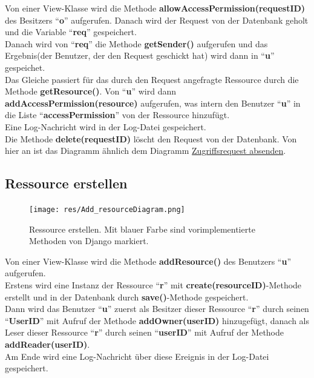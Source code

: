 \documentclass[parskip=full,11pt]{scrartcl}
\begin{document}
 Von einer View-Klasse wird die Methode \textbf{allowAccessPermission(requestID)} des Besitzers \enquote{\textbf{o}}  aufgerufen. Danach wird der Request von der Datenbank geholt und die Variable \enquote{\textbf{req}} gespeichert.\\ Danach wird von \enquote{\textbf{req}} die Methode \textbf{getSender()} aufgerufen und das Ergebnis(der Benutzer, der den Request geschickt hat) wird dann in \enquote{\textbf{u}} gespeichet.\\ Das Gleiche passiert für das durch den Request angefragte Ressource durch die Methode \textbf{getResource()}. Von \enquote{\textbf{u}} wird dann \textbf{addAccessPermission(resource)} aufgerufen, was intern den Benutzer \enquote{\textbf{u}} in die Liste \enquote{\textbf{accessPermission}} von der Ressource hinzufügt.\\
Eine Log-Nachricht wird in der Log-Datei gespeichert.\\ Die Methode \textbf{delete(requestID)} löscht den Request von der Datenbank. Von hier an ist das Diagramm ähnlich dem Diagramm \hyperref[fig:sendAccReq]{Zugriffsrequest absenden}. 
 
  \newpage
 \subsection{Ressource erstellen}
 \begin{figure}[ht!]
 	\centering
 	\texttt{[image: res/Add\_resourceDiagram.png]}
 	\caption{Ressource erstellen. Mit blauer Farbe sind vorimplementierte Methoden von Django markiert.}
 \end{figure}
 
Von einer View-Klasse wird die Methode \textbf{addResource()} des Benutzers \enquote{\textbf{u}}  aufgerufen.\\ Erstens wird eine Instanz der Ressource \enquote{\textbf{r}} mit \textbf{create(resourceID)}-Methode  erstellt und in der Datenbank  durch \textbf{save()}-Methode gespeichert.\\ Dann wird das Benutzer \enquote{\textbf{u}} zuerst als Besitzer dieser Ressource \enquote{\textbf{r}} durch seinen \enquote{\textbf{UserID}} mit Aufruf der Methode \textbf{addOwner(userID)} hinzugefügt, danach als Leser dieser Ressource \enquote{\textbf{r}} durch seinen \enquote{\textbf{userID}} mit Aufruf der Methode \textbf{addReader(userID)}.\\Am Ende wird eine Log-Nachricht über diese Ereignis in der Log-Datei gespeichert.

    \newpage
\end{document}
